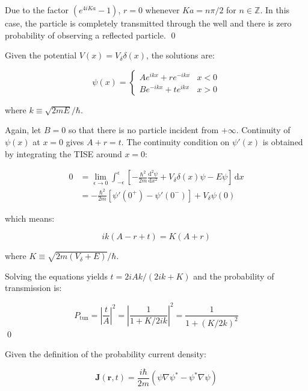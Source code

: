 \documentclass[12pt]{article}
\begin{document}
Due to the factor $(e^{4iKa} - 1)$, $r = 0$ whenever $Ka = n\pi/2$ for $n \in \mathbb{Z}$. In this case, the particle is completely transmitted through the well and there is zero probability of observing a reflected particle.
\qed


Given the potential $V(x) = V_{\delta} \delta(x)$, the solutions are:

\begin{equation}
    \psi(x) =
    \begin{cases}
        Ae^{ikx} + re^{-ikx} & x < 0 \\
        Be^{-ikx} + te^{ikx} & x > 0
    \end{cases}
\end{equation}

where $k \equiv \sqrt{2mE}/\hbar$.

Again, let $B = 0$ so that there is no particle incident from $+\infty$. Continuity of $\psi(x)$ at $x = 0$ gives $A + r = t$. The continuity condition on $\psi'(x)$ is obtained by integrating the TISE around $x = 0$:

\begin{equation}
\begin{split}
    0 &= \lim_{\epsilon \to 0} \int_{-\epsilon}^{\epsilon} \left[ -\frac{\hbar^{2}}{2m} \frac{\mathrm{d}^{2} \psi}{\mathrm{d}x^{2}} + V_{\delta} \delta(x) \psi - E \psi \right] \, \mathrm{d}x \\
    &= -\frac{\hbar^{2}}{2m} \left[ \psi'(0^{+}) - \psi'(0^{-}) \right] + V_{\delta} \psi(0)
\end{split}
\end{equation}

which means:

\begin{equation}
    ik(A - r + t) = K (A + r)
\end{equation}

where $K \equiv \sqrt{2m(V_{\delta} + E)}/\hbar$.

Solving the equations yields $t = 2iAk/(2ik + K)$ and the probability of transmission is:

\begin{equation}
    P_{\text{tun}} = \left\lvert \frac{t}{A} \right\rvert^{2} = \left\lvert \frac{1}{1 + K/2ik} \right\rvert^{2} = \frac{1}{1 + (K/2k)^{2}}
\end{equation}
\qed


Given the definition of the probability current density:

\begin{equation}
    \mathbf{J}(\mathbf{r}, t) = \frac{i\hbar}{2m} \left( \psi \nabla \psi^{*} - \psi^{*} \nabla \psi \right)
\end{equation}
\end{document}
